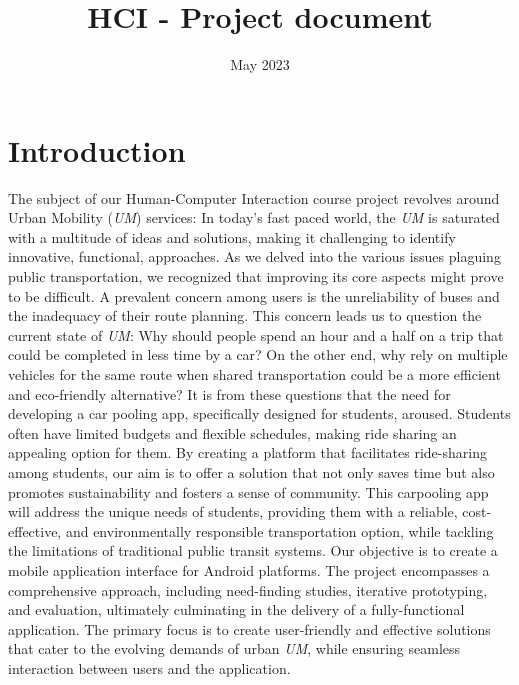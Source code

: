 \documentclass{article}
\title{HCI - Project document}
\date{May 2023}
\begin{document}
\maketitle
\newpage

\tableofcontents  
\newpage

\section{Introduction}
The subject of our Human-Computer Interaction course project revolves around Urban Mobility (\textit{UM}) services: In today's fast paced world, the \textit{UM} is saturated with a multitude of ideas and solutions, making it challenging to identify innovative, functional, approaches. As we delved into the various issues plaguing public transportation, we recognized that improving its core aspects might prove to be difficult. A prevalent concern among users is the unreliability of buses and the inadequacy of their route planning. \newline
This concern leads us to question the current state of \textit{UM}: Why should people spend an hour and a half on a trip that could be completed in less time by a car? On the other end, why rely on multiple vehicles for the same route when shared transportation could be a more efficient and eco-friendly alternative? It is from these questions that the need for developing a car pooling app, specifically designed for students, aroused. Students often have limited budgets and flexible schedules, making ride sharing an appealing option for them. By creating a platform that facilitates ride-sharing among students, our aim is to offer a solution that not only saves time but also promotes sustainability and fosters a sense of community. This carpooling app will address the unique needs of students, providing them with a reliable, cost-effective, and environmentally responsible transportation option, while tackling the limitations of traditional public transit systems. \newline
Our objective is to create a mobile application interface for Android platforms. The project encompasses a comprehensive approach, including need-finding studies, iterative prototyping, and evaluation, ultimately culminating in the delivery of a fully-functional application. The primary focus is to create user-friendly and effective solutions that cater to the evolving demands of urban \textit{UM}, while ensuring seamless interaction between users and the application. \newline \newline
\end{document}
